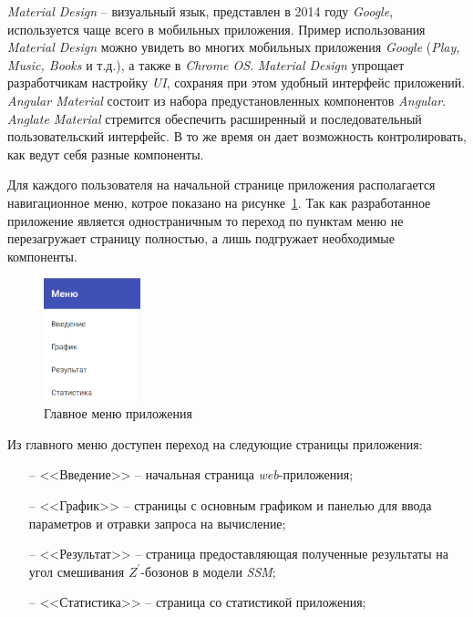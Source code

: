 \textit{Material Design} -- визуальный язык, представлен в 2014 году \textit{Google}, используется чаще всего в мобильных приложения. Пример использования \textit{Material Design} можно увидеть во многих мобильных приложения \textit{Google} (\textit{Play, Music, Books} и т.д.), а также в \textit{Chrome OS}. \textit{Material Design} упрощает разработчикам настройку \textit{UI}, сохраняя при этом удобный интерфейс приложений. \textit{Angular Material} состоит из набора предустановленных компонентов \textit{Angular}. \textit{Anglate Material} стремится обеспечить расширенный и последовательный пользовательский интерфейс. В то же время он дает возможность контролировать, как ведут себя разные компоненты.

Для каждого пользователя на начальной странице приложения располагается навигационное меню, котрое показано на рисунке~\ref{fig:menu}. Так как разработанное приложение является одностраничным то переход по пунктам меню не перезагружает страницу полностью, а лишь подгружает необходимые компоненты.

\begin{figure}[!h]
	\centering
	\includegraphics[width=0.25\textwidth]{figures/menu.png}
	\caption{Главное меню приложения}
	\label{fig:menu}
\end{figure}

Из главного меню доступен переход на следующие страницы приложения: 

\begin{enumerate}
	\item[--] <<Введение>> -- начальная страница \textit{web}-приложения;
	\item[--] <<График>> -- страницы с основным графиком и панелью для ввода параметров и отравки запроса на вычисление;
	\item[--] <<Результат>> -- страница предоставляющая полученные результаты на угол смешивания ${Z}^{\prime}$-бозонов в модели \textit{SSM};
	\item[--] <<Статистика>> -- страница со статистикой приложения;
\end{enumerate}

